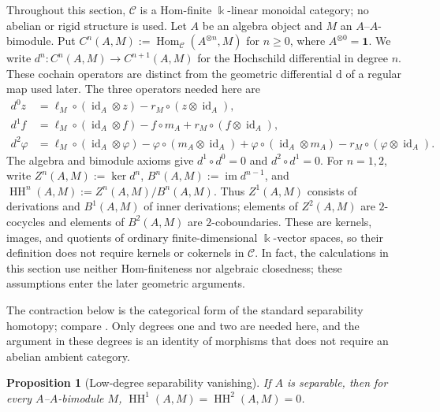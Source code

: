 \documentclass[11pt]{amsart}
\newtheorem{proposition}[theorem]{Proposition}
\theoremstyle{definition}
\theoremstyle{remark}
\newcommand{\C}{\mathcal C}
\newcommand{\one}{\mathbf 1}
\newcommand{\kk}{\Bbbk}
\DeclareMathOperator{\Hom}{Hom}
\DeclareMathOperator{\HH}{HH}
\DeclareMathOperator{\id}{id}
\begin{document}
Throughout this section, $\C$ is a Hom-finite $\kk$-linear monoidal category;
no abelian or rigid structure is used.  Let $A$ be an algebra object and $M$
an $A$--$A$-bimodule.  Put
$C^n(A,M):=\Hom_{\C}(A^{\otimes n},M)$ for $n\geq0$, where
$A^{\otimes0}=\one$.  We write
$d^n:C^n(A,M)\to C^{n+1}(A,M)$ for the Hochschild differential in
degree $n$.
These cochain operators are distinct from the geometric differential
$\mathrm d$ of a regular map used later.
The three operators needed here are
\begin{align}
 d^0z
 &=\ell_M\circ(\id_A\otimes z)-r_M\circ(z\otimes\id_A),
 \label{eq:d0}\\
 d^1f
 &=\ell_M\circ(\id_A\otimes f)-f\circ m_A
   +r_M\circ(f\otimes\id_A),
 \label{eq:d1}\\
 d^2\varphi
 &=\ell_M\circ(\id_A\otimes\varphi)
   -\varphi\circ(m_A\otimes\id_A)
   +\varphi\circ(\id_A\otimes m_A)
   -r_M\circ(\varphi\otimes\id_A).
 \label{eq:d2}
\end{align}
The algebra and bimodule axioms give
$d^1\circ d^0=0$ and $d^2\circ d^1=0$.  For $n=1,2$, write
$Z^n(A,M):=\ker d^n$, $B^n(A,M):=\operatorname{im}d^{n-1}$, and
$\HH^n(A,M):=Z^n(A,M)/B^n(A,M)$.  Thus $Z^1(A,M)$ consists of derivations
and $B^1(A,M)$ of inner derivations; elements of $Z^2(A,M)$ are
$2$-cocycles and elements of $B^2(A,M)$ are $2$-coboundaries.  These are
kernels, images, and quotients of ordinary finite-dimensional
$\kk$-vector spaces, so their definition does not require kernels or
cokernels in $\C$.  In fact, the calculations in this section use neither
Hom-finiteness nor algebraic closedness; these assumptions enter the later
geometric arguments.

The contraction below is the categorical form of the standard separability
homotopy; compare \cite[Theorem~1.30]{AMS}.  Only degrees one and two are
needed here, and the argument in these degrees is an identity of morphisms
that does not require an abelian ambient category.

\begin{proposition}[Low-degree separability vanishing]
\label{prop:hochschild-vanishing}
If $A$ is separable, then for every $A$--$A$-bimodule $M$,
$\HH^1(A,M)=\HH^2(A,M)=0$.
\end{proposition}
\end{document}
